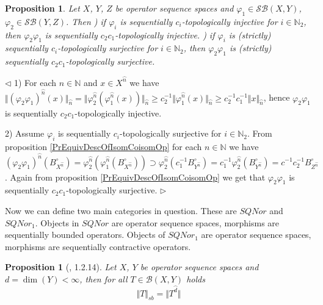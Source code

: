 \documentclass[12pt]{article}
\newtheorem{proposition}[theorem]{Proposition}
\newenvironment{proof}{\par $\triangleleft$}{$\triangleright$}
\begin{document}
\begin{proposition}\label{PrComposeSQTopInjSur} Let $X$, $Y$, $Z$ be operator sequence spaces and $\varphi_1\in\mathcal{SB}(X,Y)$, $\varphi_2\in\mathcal{SB}(Y,Z)$. Then
) if $\varphi_i$ is sequentially $c_i$-topologically injective for $i\in\mathbb{N}_2$, then $\varphi_2\varphi_1$ is sequentially $c_2c_1$-topologically injective.
) if $\varphi_i$ is (strictly) sequentially $c_i$-topologically surjective for $i\in\mathbb{N}_2$, then $\varphi_2\varphi_1$ is (strictly) sequentially $c_2c_1$-topologically surjective.
\end{proposition}
\begin{proof}
1) For each $n\in\mathbb{N}$ and $x\in X^{\wideparen{n}}$ we have $\Vert(\varphi_2\varphi_1)^{\wideparen{n}}(x)\Vert_{\wideparen{n}}=\Vert\varphi_2^{\wideparen{n}}(\varphi_1^{\wideparen{n}}(x))\Vert_{\wideparen{n}}
\geq c_2^{-1}\Vert\varphi_1^{\wideparen{n}}(x)\Vert_{\wideparen{n}}\geq c_2^{-1}c_1^{-1}\Vert x\Vert_{\wideparen{n}}$, hence $\varphi_2\varphi_1$ is sequentially $c_2c_1$-topologically injective.

2) Assume $\varphi_i$ is sequentially $c_i$-topologically surjective for $i\in\mathbb{N}_2$. From proposition \ref{PrEquivDescOfIsomCoisomOp} for each $n\in\mathbb{N}$ we have $(\varphi_2\varphi_1)^{\wideparen{n}}(B_{X^{\wideparen{n}}}^\circ)=\varphi_2^{\wideparen{n}}(\varphi_1^{\wideparen{n}}(B_{X^{\wideparen{n}}}^\circ))\supset\varphi_2^{\wideparen{n}}(c_1^{-1}B_{Y^{\wideparen{n}}}^\circ)=c_1^{-1}\varphi_2^{\wideparen{n}}(B_{Y^{\wideparen{n}}}^\circ)=c^{-1}c_2^{-1}B_{Z^{\wideparen{n}}}^\circ$. Again from proposition \ref{PrEquivDescOfIsomCoisomOp} we get that $\varphi_2\varphi_1$ is sequentially $c_2c_1$-topologically surjective.
\end{proof}


Now we can define two main categories in question. These are $SQNor$ and $SQNor_1$. Objects in $SQNor$ are operator sequence spaces, morphisms are sequentially bounded operators. Objects of $SQNor_1$ are operator sequence spaces, morphisms are sequentially contractive operators. 

\begin{proposition}[\cite{LamOpFolgen}, 1.2.14]\label{PrSmithsLemma}
Let $X$, $Y$ be operator sequence spaces and $d=\operatorname{dim}(Y)<\infty$, then for all $T\in\mathcal{B}(X,Y)$ holds
$$
\Vert T\Vert_{sb}=\Vert T^{\wideparen{d}}\Vert
$$
\end{proposition}
\end{document}
